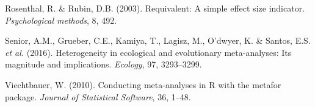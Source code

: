 \documentclass[
]{article}
\begin{document}
\leavevmode\hypertarget{ref-rosenthal2003requivalent}{}%
Rosenthal, R. \& Rubin, D.B. (2003). Requivalent: A simple effect size
indicator. \emph{Psychological methods}, 8, 492.

\leavevmode\hypertarget{ref-senior2016heterogeneity}{}%
Senior, A.M., Grueber, C.E., Kamiya, T., Lagisz, M., O'dwyer, K. \&
Santos, E.S. \emph{et al.} (2016). Heterogeneity in ecological and
evolutionary meta-analyses: Its magnitude and implications.
\emph{Ecology}, 97, 3293--3299.

\leavevmode\hypertarget{ref-viechtbauer2010conducting}{}%
Viechtbauer, W. (2010). Conducting meta-analyses in R with the metafor
package. \emph{Journal of Statistical Software}, 36, 1--48.
\end{document}
